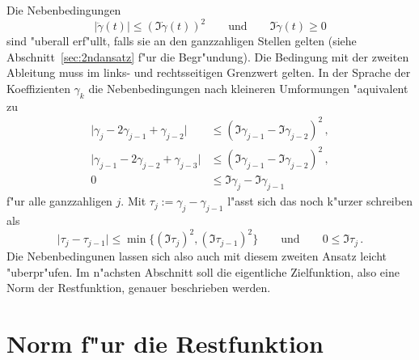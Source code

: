 \documentclass[a4paper]{scrartcl}
\begin{document}
Die Nebenbedingungen 
$$ \lvert\ddot\gamma(t)\rvert \le (\Im\dot\gamma(t))^2 
\qquad \text{und} \qquad
\Im\dot\gamma(t)\ge0 $$
sind "uberall erf"ullt, falls sie an den ganzzahligen Stellen gelten (siehe Abschnitt~\ref{sec:2ndansatz} f"ur die Begr"undung). 
Die Bedingung mit der zweiten Ableitung muss im links- und rechtsseitigen Grenzwert gelten. 
In der Sprache der Koeffizienten $\gamma_k$ die Nebenbedingungen nach kleineren Umformungen "aquivalent zu 
\begin{align*}
\lvert\gamma_j-2\gamma_{j-1}+\gamma_{j-2}\rvert 
&\le (\Im\gamma_{j-1}-\Im\gamma_{j-2})^2\,, \\
\lvert\gamma_{j-1}-2\gamma_{j-2}+\gamma_{j-3}\rvert 
&\le (\Im\gamma_{j-1}-\Im\gamma_{j-2})^2\,, \\
0&\le \Im\gamma_j-\Im\gamma_{j-1}
\end{align*}
f"ur alle ganzzahligen $j$. Mit 
$ \tau_j := \gamma_j-\gamma_{j-1} $
l"asst sich das noch k"urzer schreiben als
\begin{equation} \label{eq:condTau}
\lvert\tau_j-\tau_{j-1}\rvert \le \min\{(\Im\tau_j)^2, (\Im\tau_{j-1})^2\}
\qquad \text{und} \qquad
0\le\Im\tau_j\,.
\end{equation}
Die Nebenbedingunen lassen sich also auch mit diesem zweiten Ansatz leicht "uberpr"ufen. 
Im n"achsten Abschnitt soll die eigentliche Zielfunktion, also eine Norm der Restfunktion, genauer beschrieben werden.


\section{Norm f"ur die Restfunktion} \label{sec:norms4r}
\end{document}
